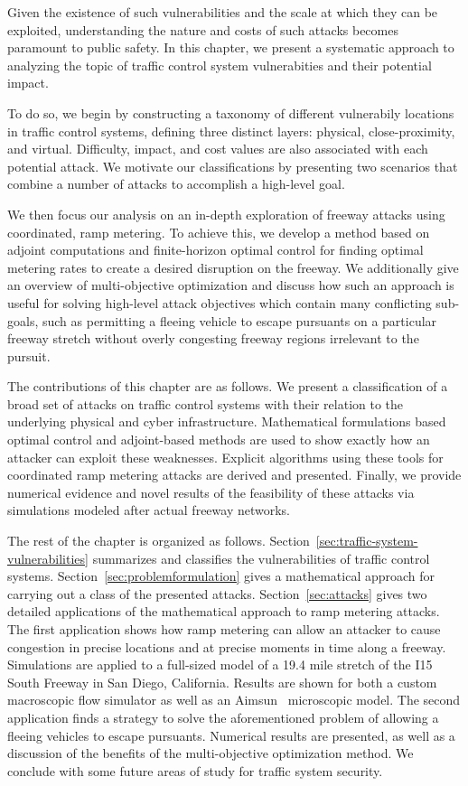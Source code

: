 Given the existence of such vulnerabilities and the scale at which they can be exploited, understanding the nature and costs of such attacks becomes paramount to public safety. In this chapter, we present a systematic approach to analyzing the topic of traffic control system vulnerabities and their potential impact.

To do so, we begin by constructing a taxonomy of different vulnerabily locations in traffic control systems, defining three distinct layers: physical, close-proximity, and virtual. Difficulty, impact, and cost values are also associated with each potential attack.  We motivate our classifications by presenting two scenarios that combine a number of attacks to accomplish a high-level goal.

We then focus our analysis on an in-depth exploration of freeway attacks using coordinated, ramp metering. To achieve this, we develop a method based on adjoint computations and finite-horizon optimal control for finding optimal metering rates to create a desired disruption on the freeway. We additionally give an overview of multi-objective optimization and discuss how such an approach is useful for solving high-level attack objectives which contain many conflicting sub-goals, such as permitting a fleeing vehicle to escape pursuants on a particular freeway stretch without overly congesting freeway regions irrelevant to the pursuit.

The contributions of this chapter are as follows. We present a classification of a broad set of attacks on traffic control systems with their relation to the underlying physical and cyber infrastructure. Mathematical formulations based optimal control and adjoint-based methods are used to show exactly how an attacker can exploit these weaknesses. Explicit algorithms using these tools for coordinated ramp metering attacks are derived and presented. Finally, we provide numerical evidence and novel results of the feasibility of these attacks via simulations modeled after actual freeway networks.

The rest of the chapter is organized as follows. Section~\ref{sec:traffic-system-vulnerabilities} summarizes and classifies the vulnerabilities of traffic control systems. Section~\ref{sec:problemformulation} gives a mathematical approach for carrying out a class of the presented attacks.  Section~\ref{sec:attacks} gives two detailed applications of the mathematical approach to ramp metering attacks. The first application shows how ramp metering can allow an attacker to cause congestion in precise locations and at precise moments in time along a freeway. Simulations are applied to a full-sized model of a 19.4 mile stretch of the I15 South Freeway in San Diego, California. Results are shown for both a custom macroscopic flow simulator as well as an Aimsun~\cite{barcelo2001microscopic} microscopic model. The second application finds a strategy to solve the aforementioned problem of allowing a fleeing vehicles to escape pursuants. Numerical results are presented, as well as a discussion of the benefits of the multi-objective optimization method. We conclude with some future areas of study for traffic system security.


